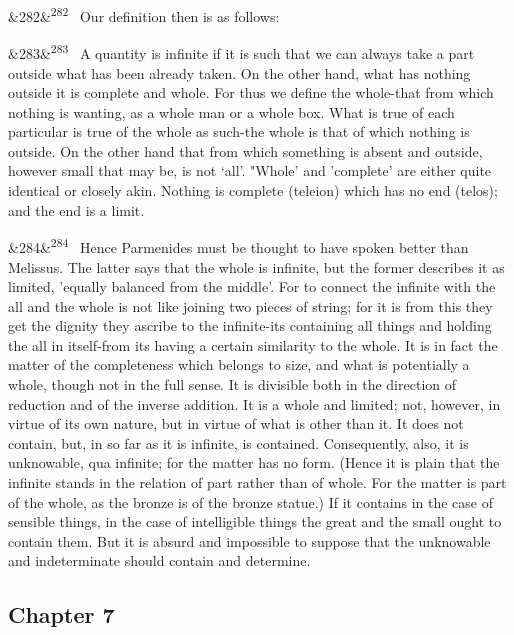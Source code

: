 \documentclass[12pt]{article}
\newcommand{\para}[1][]{\par\noindent\ifx&#1&\else\textsuperscript{\footnotesize #1}~\fi}
\begin{document}
\para[282] Our definition then is as follows:

\para[283] A quantity is infinite if it is such that we can always take a part outside what has been already taken. On the other hand, what has nothing outside it is complete and whole. For thus we define the whole-that from which nothing is wanting, as a whole man or a whole box. What is true of each particular is true of the whole as such-the whole is that of which nothing is outside. On the other hand that from which something is absent and outside, however small that may be, is not ‘all’. "Whole' and 'complete' are either quite identical or closely akin. Nothing is complete (teleion) which has no end (telos); and the end is a limit.

\para[284] Hence Parmenides must be thought to have spoken better than Melissus. The latter says that the whole is infinite, but the former describes it as limited, 'equally balanced from the middle’. For to connect the infinite with the all and the whole is not like joining two pieces of string; for it is from this they get the dignity they ascribe to the infinite-its containing all things and holding the all in itself-from its having a certain similarity to the whole. It is in fact the matter of the completeness which belongs to size, and what is potentially a whole, though not in the full sense. It is divisible both in the direction of reduction and of the inverse addition. It is a whole and limited; not, however, in virtue of its own nature, but in virtue of what is other than it. It does not contain, but, in so far as it is infinite, is contained. Consequently, also, it is unknowable, qua infinite; for the matter has no form. (Hence it is plain that the infinite stands in the relation of part rather than of whole. For the matter is part of the whole, as the bronze is of the bronze statue.) If it contains in the case of sensible things, in the case of intelligible things the great and the small ought to contain them. But it is absurd and impossible to suppose that the unknowable and indeterminate should contain and determine.

\subsection*{Chapter 7}
\end{document}
